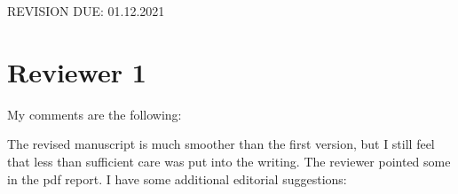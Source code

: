 
\newcommand{\DONE}{{\color{green!60!black}\makebox[0pt][l]{$\square$}\raisebox{.15ex}{\hspace{0.1em}$\checkmark$}}~}
\newcommand{\DOIT}{{\color{red!60!black}\makebox[0pt][l]{$\square$}\raisebox{.15ex}{\hspace{0.1em}$\boxtimes$}}~}
\newcommand{\PROGRESS}{(in progress)~}


REVISION DUE: 01.12.2021

\section*{Reviewer 1}

My comments are the following:

The revised manuscript is much smoother than the first version, but I still feel that less than sufficient care was put into the writing. The reviewer pointed some in the pdf report. I have some additional editorial suggestions:

